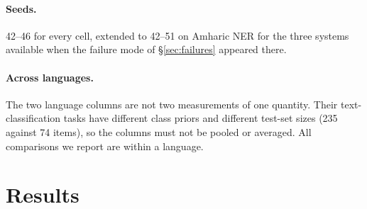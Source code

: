 \documentclass[11pt]{article}
\begin{document}
\paragraph{Seeds.} 42--46 for every cell, extended to 42--51 on Amharic NER
for the three systems available when the failure mode of
\S\ref{sec:failures} appeared there.

\paragraph{Across languages.} The two language columns are not two
measurements of one quantity. Their text-classification tasks have different
class priors and different test-set sizes (235 against 74 items), so the
columns must not be pooled or averaged. All comparisons we report are within
a language.

\section{Results}
\label{sec:results}
\end{document}
